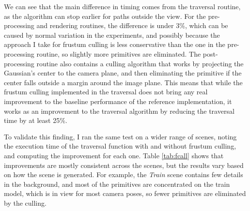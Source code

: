 \begin{figure}[H]
\end{figure}

We can see that the main difference in timing comes from the traversal routine, as the algorithm can stop earlier for paths outside the view. For the pre-processing and rendering routines, the difference is under 3\%, which can be caused by normal variation in the experiments, and possibly because the approach I take for frustum culling is less conservative than the one in the pre-processing routine, so slightly more primitives are eliminated. The post-processing routine also contains a culling algorithm that works by projecting the Gaussian's center to the camera plane, and then eliminating the primitive if the center falls outside a margin around the image plane. This means that while the frustum culling implemented in the traversal does not bring any real improvement to the baseline performance of the reference implementation, it works as an improvement to the traversal algorithm by reducing the traversal time by at least 25\%.

To validate this finding, I ran the same test on a wider range of scenes, noting the execution time of the traversal function with and without frustum culling, and computing the improvement for each one. Table \ref{tab:fcall} shows that improvements are mostly consistent across the scenes, but the results vary based on how the scene is generated. For example, the \textit{Train} scene contains few details in the background, and most of the primitives are concentrated on the train model, which is in view for most camera poses, so fewer primitives are eliminated by the culling.

